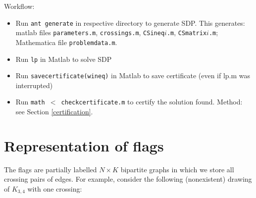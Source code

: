 \documentclass{article}
\begin{document}
Workflow:
\begin{itemize}
\item Run \texttt{ant generate} in respective directory to generate SDP. 
This generates: matlab files \texttt{parameters.m}, \texttt{crossings.m},
\texttt{CSineq$i$.m}, \texttt{CSmatrix$i$.m}; Mathematica file
\texttt{problemdata.m}.
\item Run \texttt{lp} in Matlab to solve SDP 
\item Run \texttt{savecertificate(wineq)} in Matlab to save certificate (even if lp.m was interrupted)
\item Run \texttt{math $<$ checkcertificate.m} to certify the solution found.
Method: see Section \ref{certification}.
\end{itemize}

\section{Representation of flags}
The flags are partially labelled $N\times K$ bipartite graphs in which we 
store all crossing pairs of edges. 
For example, consider the following (nonexistent) drawing of $K_{3, 4}$ with one crossing:

\begin{center}
\end{center}
\end{document}
